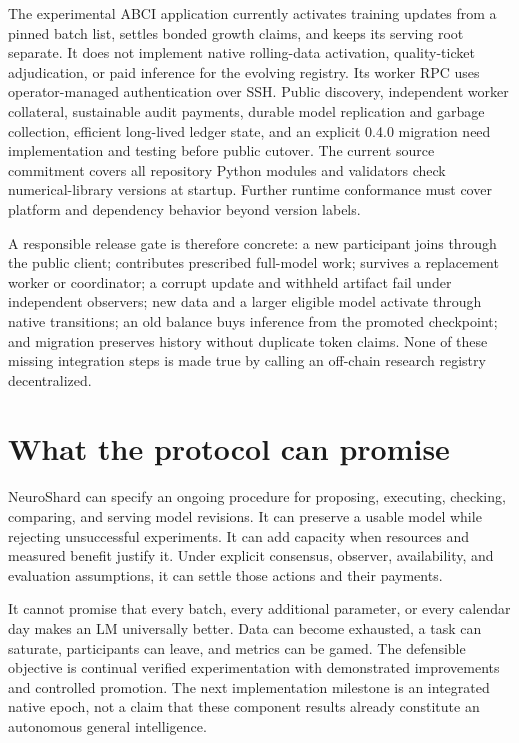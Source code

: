 \documentclass[11pt]{article}
\begin{document}
The experimental ABCI application currently activates training updates from a pinned batch list, settles bonded growth claims, and keeps its serving root separate. It does not implement native rolling-data activation, quality-ticket adjudication, or paid inference for the evolving registry. Its worker RPC uses operator-managed authentication over SSH. Public discovery, independent worker collateral, sustainable audit payments, durable model replication and garbage collection, efficient long-lived ledger state, and an explicit 0.4.0 migration need implementation and testing before public cutover. The current source commitment covers all repository Python modules and validators check numerical-library versions at startup. Further runtime conformance must cover platform and dependency behavior beyond version labels.

A responsible release gate is therefore concrete: a new participant joins through the public client; contributes prescribed full-model work; survives a replacement worker or coordinator; a corrupt update and withheld artifact fail under independent observers; new data and a larger eligible model activate through native transitions; an old balance buys inference from the promoted checkpoint; and migration preserves history without duplicate token claims. None of these missing integration steps is made true by calling an off-chain research registry decentralized.

\section{What the protocol can promise}
NeuroShard can specify an ongoing procedure for proposing, executing, checking, comparing, and serving model revisions. It can preserve a usable model while rejecting unsuccessful experiments. It can add capacity when resources and measured benefit justify it. Under explicit consensus, observer, availability, and evaluation assumptions, it can settle those actions and their payments.

It cannot promise that every batch, every additional parameter, or every calendar day makes an LM universally better. Data can become exhausted, a task can saturate, participants can leave, and metrics can be gamed. The defensible objective is continual verified experimentation with demonstrated improvements and controlled promotion. The next implementation milestone is an integrated native epoch, not a claim that these component results already constitute an autonomous general intelligence.
\end{document}

